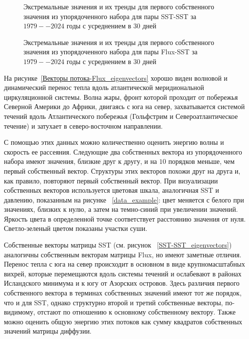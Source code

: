 \begin{figure}
	\caption{Экстремальные значения и их тренды для первого собственного значения из упорядоченного набора для пары SST-SST за $1979--2024$ годы с усреднением в $30$ дней}
	\label{SST-SST_trends}
\end{figure}

\begin{figure}
	\caption{Экстремальные значения и их тренды для первого собственного значения из упорядоченного набора для пары Flux-SST за $1979--2024$ годы с усреднением в $30$ дней}
	\label{Flux-SST_trends}
\end{figure}

На рисунке~\ref{Векторы потока-Flux_eigenvectors} хорошо виден волновой и динамический перенос тепла вдоль атлантической меридиональной циркуляционной системы. Волна жары, фронт которой проходит от побережья Северной Америки до Африки, двигаясь с юга на север, захватывается системой течений вдоль Атлантического побережья (Гольфстрим и Североатлантическое течение) и затухает в северо-восточном направлении.

С помощью этих данных можно количественно оценить энергию волны и скорость ее рассеяния. Следующие два собственных вектора из упорядоченного набора имеют значения, близкие друг к другу, и на $10$ порядков меньше, чем первый собственный вектор. Структуры этих векторов похожи друг на друга и, как правило, повторяют первый собственный вектор. При визуализации собственных векторов используется цветовая шкала, аналогичная SST и давлению, показанным на рисунке ~\ref{data_example}: цвет меняется с белого при значениях, близких к нулю, а затем на темно-синий при увеличении значений. Яркость цвета в определенной точке соответствует расстоянию значения от нуля. Светло-зеленый цветом показаны участки суши.

Собственные векторы матрицы SST (см. рисунок ~\ref{SST-SST_eigenvectors}) аналогичны собственным векторам матрицы Flux, но имеют заметные отличия. Перенос тепла с юга на север происходит в основном в виде крупномасштабных вихрей, которые перемещаются вдоль системы течений и ослабевают в районах Исландского минимума и к югу от Азорских островов. Здесь различия первого собственного вектора в терминах собственных значений имеют тот же порядок, что и для SST, однако структурно второй и третий собственные векторы, по-видимому, отстают по отношению к основному собственному вектору. Также можно оценить общую энергию этих потоков как сумму квадратов собственных значений матрицы диффузии.


